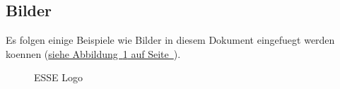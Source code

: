 \documentclass[12pt,a4paper,titlepage,oneside]{scrartcl}
\begin{document}
\subsection{Bilder}

Es folgen einige Beispiele wie Bilder in diesem Dokument eingefuegt werden koennen
(\hyperref[fig:logo1]{siehe Abbildung~\ref*{fig:logo1} auf Seite~\pageref*{fig:logo1}}).

\begin{figure}[h!]
  \centering
  \caption{ESSE Logo}
  \label{fig:logo1}
\end{figure}
\end{document}
